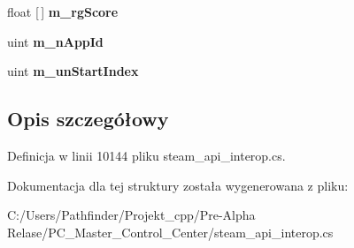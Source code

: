 \begin{DoxyCompactItemize}
float \mbox{[}$\,$\mbox{]} {\bfseries m\+\_\+rg\+Score}
\item 
\mbox{\label{struct_valve_1_1_steamworks_1_1_remote_storage_enumerate_workshop_files_result__t_a9705fefba8100eae767d095b8271add0}} 
uint {\bfseries m\+\_\+n\+App\+Id}
\item 
\mbox{\label{struct_valve_1_1_steamworks_1_1_remote_storage_enumerate_workshop_files_result__t_aa501310997ab67af816585fc296b1d44}} 
uint {\bfseries m\+\_\+un\+Start\+Index}
\end{DoxyCompactItemize}


\subsection{Opis szczegółowy}


Definicja w linii 10144 pliku steam\+\_\+api\+\_\+interop.\+cs.



Dokumentacja dla tej struktury została wygenerowana z pliku\+:\begin{DoxyCompactItemize}
\item 
C\+:/\+Users/\+Pathfinder/\+Projekt\+\_\+cpp/\+Pre-\/\+Alpha Relase/\+P\+C\+\_\+\+Master\+\_\+\+Control\+\_\+\+Center/steam\+\_\+api\+\_\+interop.\+cs\end{DoxyCompactItemize}
